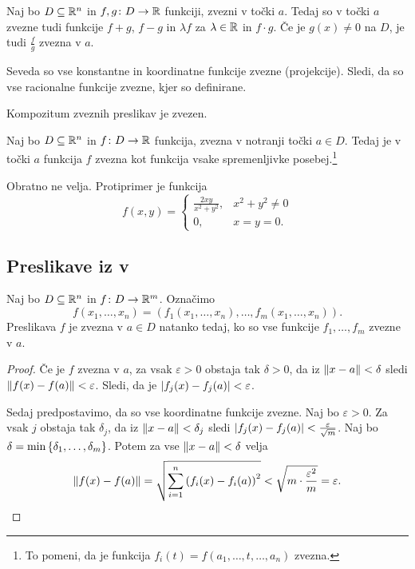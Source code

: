 \begin{izrek}
Naj bo $D \subseteq \mathbb{R}^n$ in $f, g \colon D \to \mathbb{R}$ funkciji,
zvezni v točki $a$. Tedaj so v točki $a$ zvezne tudi funkcije
$f + g$, $f - g$ in $\lambda f$ za $\lambda \in \mathbb{R}$ in $f\cdot g$.
Če je $g(x) \ne 0$ na $D$, je tudi $\frac{f}{g}$ zvezna v $a$.
\end{izrek}

\obvs

\begin{opomba}
Seveda so vse konstantne in koordinatne funkcije zvezne
(projekcije). Sledi, da so vse racionalne funkcije zvezne, kjer so
definirane.
\end{opomba}

\begin{opomba}
Kompozitum zveznih preslikav je zvezen.
\end{opomba}

\begin{izrek}
Naj bo $D \subseteq \mathbb{R}^n$ in $f \colon D \to \mathbb{R}$ funkcija, zvezna v
notranji točki $a \in D$. Tedaj je v točki $a$ funkcija $f$ zvezna
kot funkcija vsake spremenljivke posebej.\footnote{To pomeni, da je
funkcija $f_i(t) = f(a_1, \dots, t, \dots, a_n)$ zvezna.}
\end{izrek}

\obvs

\begin{opomba}
Obratno ne velja. Protiprimer je funkcija
\[
f(x,y)=\begin{cases}
\frac{2xy}{x^2+y^2},& x^2+y^2\ne 0 \\
0,& x=y=0.
\end{cases}
\]
\end{opomba}

\newpage

\subsection{Preslikave iz  v }

\begin{trditev}
Naj bo $D \subseteq \mathbb{R}^n$ in $f \colon D \to \mathbb{R}^m$. Označimo
\[
f(x_1, \dots, x_n) =
\left(f_1(x_1, \dots, x_n), \dots, f_m(x_1, \dots, x_n)\right).
\]
Preslikava $f$ je zvezna v $a \in D$ natanko tedaj, ko so vse
funkcije $f_1, \dots, f_m$ zvezne v $a$.
\end{trditev}

\begin{proof}
Če je $f$ zvezna v $a$, za vsak $\varepsilon > 0$ obstaja tak
$\delta > 0$, da iz $\left\lVert x - a\right\rVert < \delta$ sledi
$\left\lVert f(x) - f(a)\right\rVert < \varepsilon$. Sledi, da je
$\left\lvert f_j(x) - f_j(a)\right\rvert < \varepsilon$.

Sedaj predpostavimo, da so vse koordinatne funkcije zvezne. Naj bo
$\varepsilon > 0$. Za vsak $j$ obstaja tak $\delta_j$, da iz
$\left\lVert x - a\right\rVert < \delta_j$ sledi
$\left\lvert f_j(x) - f_j(a)\right\rvert < \frac{\varepsilon}{\sqrt{m}}$. Naj bo
$\delta = \min\left\{\delta_1, \dots, \delta_m\right\}$. Potem za vse
$\left\lVert x - a\right\rVert < \delta$ velja
\[
\left\lVert f(x) - f(a)\right\rVert =
\sqrt{\sum_{i=1}^n \left(f_i(x) - f_i(a)\right)^2} <
\sqrt{m \cdot \frac{\varepsilon^2}{m}} = \varepsilon. \qedhere
\]
\end{proof}

